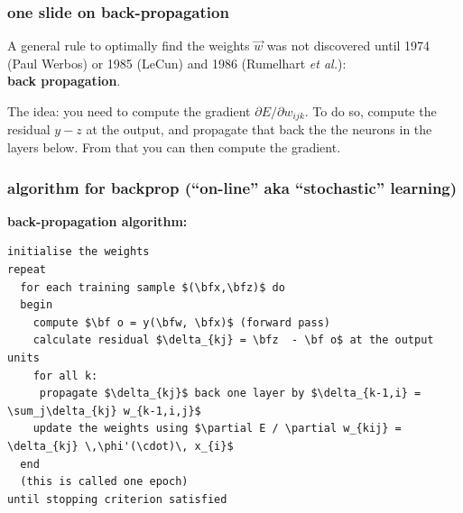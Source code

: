 \documentclass[USenglish,pdftex,compress,10pt,svgnamesi,handout]{beamer}
\newcommand{\bfw}{\Vec{w}}
\newcommand{\bfx}{\Vec{x}}
\newcommand{\bfz}{\Vec{z}}
\def\bf#1{\Vec{#1}}
\begin{document}
\begin{frame}
\frametitle{one slide on back-propagation}

A general rule to optimally find the weights $\bfw$ was not discovered until 1974 (Paul Werbos) or 1985 (LeCun) and 1986 (Rumelhart \textsl{et al.}): \\\textbf{back propagation}.

\vskip5mm

The idea: you need to compute the gradient $\partial E / \partial w_{ijk}$.  To do so, compute the residual $y-z$ at the output, and propagate that back the the neurons in the layers below.
From that you can then compute the gradient.

\vfill
\end{frame}


\begin{frame}[fragile]
\frametitle{algorithm for backprop (``on-line'' aka ``stochastic'' learning)}

\begin{beamerboxesrounded}[upper=def,lower=block body,width=1.03\textwidth,shadow]{\textbf{back-propagation algorithm:}}
\begin{lstlisting}[mathescape]
initialise the weights
repeat
  for each training sample $(\bfx,\bfz)$ do
  begin
    compute $\bf o = y(\bfw, \bfx)$ (forward pass)
    calculate residual $\delta_{kj} = \bfz  - \bf o$ at the output units
    for all k:
     propagate $\delta_{kj}$ back one layer by $\delta_{k-1,i} = \sum_j\delta_{kj} w_{k-1,i,j}$
    update the weights using $\partial E / \partial w_{kij} = \delta_{kj} \,\phi'(\cdot)\, x_{i}$
  end
  (this is called one epoch)
until stopping criterion satisfied
\end{lstlisting}
\end{beamerboxesrounded}
\end{frame}
\end{document}
